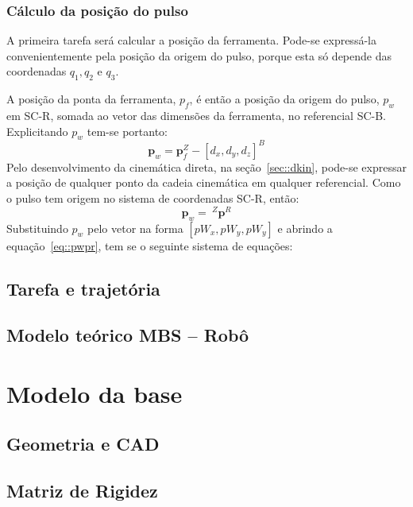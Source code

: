 \subsubsection{Cálculo da posição do pulso}

A primeira tarefa será calcular a posição da ferramenta. Pode-se expressá-la
convenientemente pela posição da origem do pulso, porque esta só depende das
coordenadas $q_1, q_2$ e $q_3$.

A posição da ponta da ferramenta, $p_{f}$, é então a posição da origem do pulso,
$p_{w}$ em SC-R, somada ao vetor das dimensões da ferramenta, no referencial
SC-B. Explicitando $p_{w}$ tem-se portanto:
%
\begin{equation}
	\mathbf{p}_{w} = \mathbf{p}_{f}^Z - [d_{x}, d_{y}, d_{z}]^B \label{eq::posw}
\end{equation}
%
Pelo desenvolvimento da cinemática direta, na seção~\ref{sec::dkin}, pode-se
expressar a posição de qualquer ponto da cadeia cinemática em qualquer
referencial. Como o pulso tem origem no sistema de coordenadas SC-R, então:
%
\begin{equation}
	\mathbf{p}_{w} =~^Z{\mathbf{p}}^R \label{eq::pwpr}
\end{equation}
%
Substituindo $p_{w}$ pelo vetor na forma $[pW_{x}, pW_{y}, pW_{y}]$ e abrindo a
equação~\ref{eq::pwpr}, tem se o seguinte sistema de equações:


\subsection{Tarefa e trajetória}

\subsection{Modelo teórico MBS -- Robô}


\section{Modelo da base}

\subsection{Geometria e CAD}

\subsection{Matriz de Rigidez}

